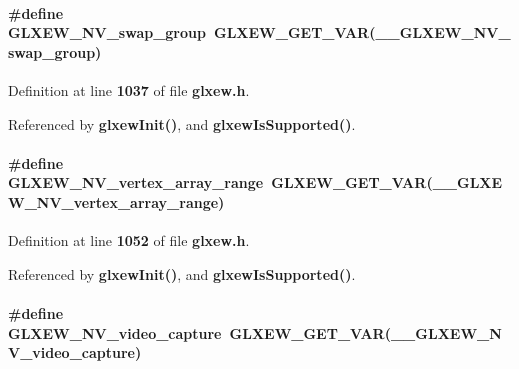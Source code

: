 \paragraph[{G\+L\+X\+E\+W\+\_\+\+N\+V\+\_\+swap\+\_\+group}]{\setlength{\rightskip}{0pt plus 5cm}\#define G\+L\+X\+E\+W\+\_\+\+N\+V\+\_\+swap\+\_\+group~{\bf G\+L\+X\+E\+W\+\_\+\+G\+E\+T\+\_\+\+V\+AR}({\bf \+\_\+\+\_\+\+G\+L\+X\+E\+W\+\_\+\+N\+V\+\_\+swap\+\_\+group})}\label{glxew_8h_acf5ae111355e4ef02c8da685ae541214}


Definition at line {\bf 1037} of file {\bf glxew.\+h}.



Referenced by {\bf glxew\+Init()}, and {\bf glxew\+Is\+Supported()}.

\paragraph[{G\+L\+X\+E\+W\+\_\+\+N\+V\+\_\+vertex\+\_\+array\+\_\+range}]{\setlength{\rightskip}{0pt plus 5cm}\#define G\+L\+X\+E\+W\+\_\+\+N\+V\+\_\+vertex\+\_\+array\+\_\+range~{\bf G\+L\+X\+E\+W\+\_\+\+G\+E\+T\+\_\+\+V\+AR}({\bf \+\_\+\+\_\+\+G\+L\+X\+E\+W\+\_\+\+N\+V\+\_\+vertex\+\_\+array\+\_\+range})}\label{glxew_8h_ad53e2e3a9b762d7ec2425e89e7436053}


Definition at line {\bf 1052} of file {\bf glxew.\+h}.



Referenced by {\bf glxew\+Init()}, and {\bf glxew\+Is\+Supported()}.

\paragraph[{G\+L\+X\+E\+W\+\_\+\+N\+V\+\_\+video\+\_\+capture}]{\setlength{\rightskip}{0pt plus 5cm}\#define G\+L\+X\+E\+W\+\_\+\+N\+V\+\_\+video\+\_\+capture~{\bf G\+L\+X\+E\+W\+\_\+\+G\+E\+T\+\_\+\+V\+AR}({\bf \+\_\+\+\_\+\+G\+L\+X\+E\+W\+\_\+\+N\+V\+\_\+video\+\_\+capture})}\label{glxew_8h_a79d2d300c9c3c04fe8cb3d2ddb11eec1}


